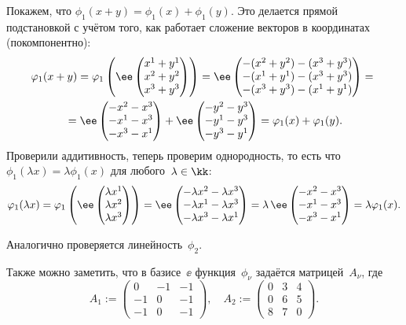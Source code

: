 \begin{solution}
	Покажем, что $\phi_1(x + y) = \phi_1(x) + \phi_1(y)$. Это делается прямой подстановкой с учётом того, как работает сложение векторов в координатах (покомпонентно):
	\begin{multline*}
		\phi_1(x + y) =
		\phi_1
		\left( 
			\ee
			\Vect{
				x^1 + y^1
				\\
				x^2 + y^2
				\\
				x^3 + y^3
			}
		\right)
		=
		\ee
		\Vect{
			-\xpy{2} - \xpy{3}
			\\
			-\xpy{1} - \xpy{3}
			\\
			-\xpy{3} - \xpy{1}
		}
		\nline{=}
		\ee
		\Vect{
			-x^2 - x^3
			\\
			-x^1 - x^3
			\\
			-x^3 - x^1
		}
		+
		\ee
		\Vect{
			-y^2 - y^3
			\\
			-y^1 - y^3
			\\
			-y^3 - y^1
		}
		=
		\phi_1(x) + \phi_1(y)
		.
	\end{multline*}
	Проверили аддитивность, теперь проверим однородность, то есть что~$\phi_1(\lambda x) = \lambda \phi_1(x)$ для любого~$\lambda \in \kk$:
	\[
		\phi_1(\lambda x) =
		\phi_1
		\left( 
			\ee
			\Vect{
				\lambda x^1 \\
				\lambda x^2 \\
				\lambda x^3 \\
			}
		\right)
		=
		\ee
		\Vect{
			-\lambda x^2 - \lambda x^3
			\\
			-\lambda x^1 - \lambda x^3
			\\
			-\lambda x^3 - \lambda x^1
		}
		=
		\lambda
		\,
		\ee
		\Vect{
			-x^2 - x^3
			\\
			-x^1 - x^3
			\\
			-x^3 - x^1
		}
		=
		\lambda \phi_1(x)
		.
	\]

	Аналогично проверяется линейность~$\phi_2$.

	Также можно заметить, что в базисе~$\ee$ функция~$\phi_\nu$ задаётся матрицей~$A_\nu$, где
	\[
		A_1 :=
		\begin{pmatrix}
			0 & -1 & -1 \\
			-1 & 0 & -1 \\
			-1 & 0 & -1
		\end{pmatrix}
		,
		\quad
		A_2 :=
		\begin{pmatrix}
			0 & 3 & 4 \\
			0 & 6 & 5 \\
			8 & 7 & 0
		\end{pmatrix}
		.
	\]
\end{solution}
